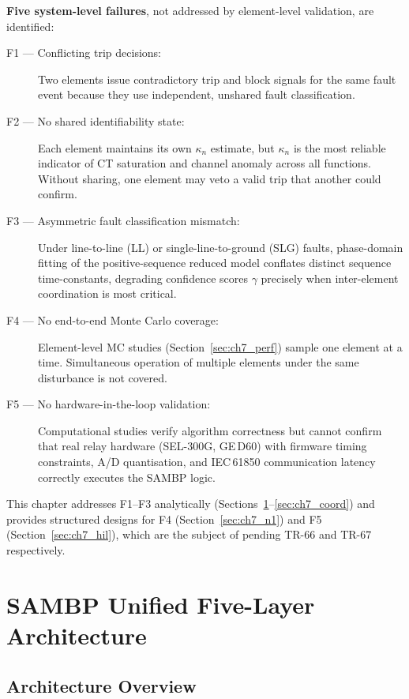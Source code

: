 \textbf{Five system-level failures}, not addressed by element-level
validation, are identified:
\begin{description}
  \item[F1 — Conflicting trip decisions:] Two elements issue contradictory
    trip and block signals for the same fault event because they use
    independent, unshared fault classification.
  \item[F2 — No shared identifiability state:] Each element maintains its
    own $\kappa_n$ estimate, but $\kappa_n$ is the most reliable indicator
    of CT saturation and channel anomaly across all functions.  Without
    sharing, one element may veto a valid trip that another could confirm.
  \item[F3 — Asymmetric fault classification mismatch:] Under line-to-line
    (LL) or single-line-to-ground (SLG) faults, phase-domain fitting of
    the positive-sequence reduced model conflates distinct sequence
    time-constants, degrading confidence scores $\gamma$ precisely when
    inter-element coordination is most critical.
  \item[F4 — No end-to-end Monte Carlo coverage:] Element-level MC studies
    (Section~\ref{sec:ch7_perf}) sample one element at a time.  Simultaneous
    operation of multiple elements under the same disturbance is not covered.
  \item[F5 — No hardware-in-the-loop validation:] Computational studies
    verify algorithm correctness but cannot confirm that real relay hardware
    (SEL-300G, GE\,D60) with firmware timing constraints, A/D quantisation,
    and IEC\,61850 communication latency correctly executes the SAMBP logic.
\end{description}

This chapter addresses F1--F3 analytically (Sections~\ref{sec:ch7_unified_arch}--\ref{sec:ch7_coord})
and provides structured designs for F4 (Section~\ref{sec:ch7_n1}) and
F5 (Section~\ref{sec:ch7_hil}), which are the subject of pending
TR-66 and TR-67 respectively.

\section{SAMBP Unified Five-Layer Architecture}
\label{sec:ch7_unified_arch}

\subsection{Architecture Overview}

